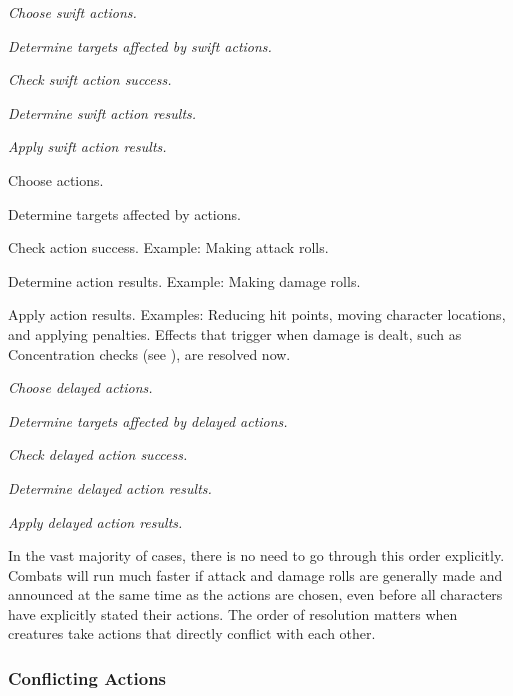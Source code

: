         \begin{enumerate*}
            \item \textit{Choose swift actions.}
            \item \textit{Determine targets affected by swift actions.}
            \item \textit{Check swift action success.}
            \item \textit{Determine swift action results.}
            \item \textit{Apply swift action results.}
            \item Choose actions.
            \item Determine targets affected by actions.
            \item Check action success.
                Example: Making attack rolls.
            \item Determine action results.
                Example: Making damage rolls.
            \item Apply action results.
                Examples: Reducing hit points, moving character locations, and applying penalties.
                Effects that trigger when damage is dealt, such as Concentration checks (see ), are resolved now.
            \item \textit{Choose delayed actions.}
            \item \textit{Determine targets affected by delayed actions.}
            \item \textit{Check delayed action success.}
            \item \textit{Determine delayed action results.}
            \item \textit{Apply delayed action results.}
        \end{enumerate*}

        In the vast majority of cases, there is no need to go through this order explicitly.
        Combats will run much faster if attack and damage rolls are generally made and announced at the same time as the actions are chosen, even before all characters have explicitly stated their actions.
        The order of resolution matters when creatures take actions that directly conflict with each other.

        \subsubsection{Conflicting Actions}\label{Conflicting Actions}

